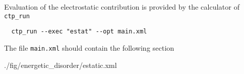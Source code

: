 Evaluation of the electrostatic contribution is provided by the \estat calculator of \texttt{ctp\_run} 
\begin{verbatim}
  ctp_run --exec "estat" --opt main.xml
\end{verbatim}

The file \texttt{main.xml} should contain the following section 

%
{./fig/energetic_disorder/estatic.xml}
